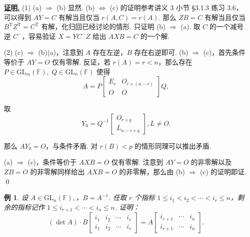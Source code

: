 \documentclass[10pt,openany]{article}
\theoremstyle{thmstyle} %
\theoremstyle{defstyle} %
\theoremstyle{prostyle} %
\theoremstyle{exastyle}
\newtheorem{example}[theorem]{例}
\theoremstyle{remstyle}
\renewenvironment{proof}[1][证明]{\par\underline{\textbf{#1.}} \;\fangsong}{\qed\par}
\newcommand{\T}{^{\text{T}}}
\newcommand{\gfn}{\text{GL}_n(\mathbb{F})}
\newcommand{\gfm}{\text{GL}_m(\mathbb{F})}
\begin{document}
\begin{proof}
	(1) (a) \( \Rightarrow \) (b) 显然. (b) \( \Leftrightarrow \) (c) 的证明参考讲义 3 小节 \S 3.1.3 练习 3.6，可以得到 \( AY=C \) 有解当且仅当 \( r(A,C)=r(A) \). 那么 \( ZB=C \) 有解当且仅当 \( B\T Z\T= C\T \) 有解，化归回已经讨论的情形. 只证明 (b) \( \Rightarrow \) (a). 取 \( C \) 的一个减号逆 \( C^{-} \)，容易验证 \( X=YC^{-}Z \) 给出 \( AXB=C \) 的一个解.
	
	(2) (c) \( \Rightarrow \) (b)(a)，注意到 \( A \) 存在左逆，\( B \) 存在右逆即可. (b) \( \Rightarrow \) (c)，首先条件等价于 \( AY=O \) 仅有零解. 反证，若 \( r(A)=r<n \)，那么存在 \( P \in \gfm, \; Q \in \gfn \) 使得
	\[ A=P\begin{bmatrix}
		E_r & O_{r \times (n-r)} \\
		O & O
	\end{bmatrix}Q, \]
	
	取
	\[ Y_0=Q^{-1}\begin{bmatrix}
		O_{r \times q} \\
		L_{n-r \times q}
	\end{bmatrix}, L \neq O. \]
	
	那么 \( AY_0=O \)，与条件矛盾. 对 \( r(B)<p \) 的情形同理可以推出矛盾.
	
	(a) \( \Rightarrow \) (c)，条件等价于 \( AXB=O \) 仅有零解. 注意到 \( AY=O \) 的非零解以及 \( ZB=O \) 的非零解同样给出 \( AXB=O \) 的非零解，那么由 (b) \( \Rightarrow \) (c) 的证明即证.
\end{proof}


\begin{example}
	设 \( A \in \gfn, \)，\( B=A^{-1} \). 任取 \( r \) 个指标 \( 1 \leq i_1<i_2<\cdots<i_r \leq n \)，剩余的指标记作 \( 1 \leq i_{r+1}<\cdots<i_{n} \leq n \). 证明：
	\[ (\det A) \cdot B \begin{bmatrix}
		i_1 & i_2 & \cdots & i_r \\
		i_1 & i_2 & \cdots & i_r
	\end{bmatrix}= A \begin{bmatrix}
	i_{r+1}  & \cdots & i_n \\
	i_{r+1}  & \cdots & i_n
	\end{bmatrix}. \]
\end{example}
\end{document}
